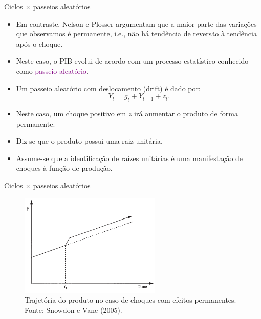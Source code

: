 \documentclass[10pt]{beamer}
\begin{document}
\begin{frame}{Ciclos $\times$ passeios aleatórios}
    \begin{itemize}
        \item Em contraste, Nelson e Plosser argumentam que a maior parte das variações que observamos é permanente, i.e., não há tendência de reversão à tendência após o choque.
        \bigskip
        \item Neste caso, o PIB evolui de acordo com um processo estatístico conhecido como \textcolor{purple}{passeio aleatório}.
        \bigskip
        \item Um passeio aleatório com deslocamento (drift) é dado por:
        \[
        Y_t = g_t + Y_{t-1} + z_t.
        \]
        \bigskip
        \item Neste caso, um choque positivo em $z$ irá aumentar o produto de forma permanente.
        \bigskip
        \item Diz-se que o produto possui uma raiz unitária.
        \bigskip
        \item Assume-se que a identificação de raízes unitárias é uma manifestação de choques à função de produção.
    \end{itemize}
\end{frame}

\begin{frame}{Ciclos $\times$ passeios aleatórios}
    \begin{figure}
        \centering
        \includegraphics[width=0.6\textwidth]{./figures/aula14_fig4.PNG}
        \caption{Trajetória do produto no caso de choques com efeitos permanentes. Fonte: Snowdon e Vane (2005).}
        \label{fig4}
    \end{figure}
\end{frame}
\end{document}
